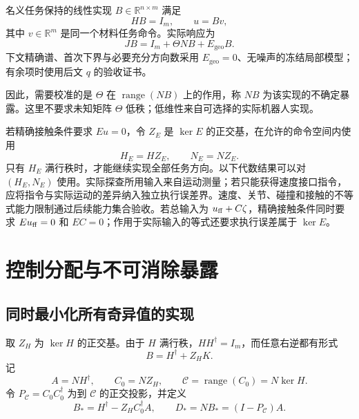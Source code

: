 \documentclass[11pt,a4paper]{article}
\numberwithin{equation}{section}
\theoremstyle{definition}
\begin{document}
名义任务保持的线性实现 $B\in\mathbb R^{n\times m}$ 满足
\begin{equation}
  HB=I_m,\qquad u=Bv ,
  \label{eq:cal-lift}
\end{equation}
其中 $v\in\mathbb R^m$ 是同一个材料任务命令。实际响应为
\begin{equation}
  JB=I_m+\Theta NB+E_{\mathrm{geo}}B .
  \label{eq:cal-exposure}
\end{equation}
下文精确谱、首次下界与必要充分方向数采用 $E_{\mathrm{geo}}=0$、无噪声的冻结局部模型；有余项时使用后文 $q$ 的验收证书。

因此，需要校准的是 $\Theta$ 在 $\operatorname{range}(NB)$ 上的作用，称 $NB$ 为该实现的不确定暴露。这里不要求未知矩阵 $\Theta$ 低秩；低维性来自可选择的实际机器人实现。

若精确接触条件要求 $Eu=0$，令 $Z_E$ 是 $\ker E$ 的正交基，在允许的命令空间内使用
\begin{equation}
  H_E=HZ_E,\qquad N_E=NZ_E .
  \label{eq:cal-contact-reduction}
\end{equation}
只有 $H_E$ 满行秩时，才能继续实现全部任务方向。以下代数结果可以对 $(H_E,N_E)$ 使用。实际探查所用输入来自运动测量；若只能获得速度接口指令，应将指令与实际运动的差异纳入独立执行误差界。速度、关节、碰撞和接触的不等式能力限制通过后续能力集合验收。若总输入为 $u_{\rm ff}+C\zeta$，精确接触条件同时要求 $Eu_{\rm ff}=0$ 和 $EC=0$；作用于实际输入的等式还要求执行误差属于 $\ker E$。





\section{控制分配与不可消除暴露}
\label{sec:cal-realization}

\subsection{同时最小化所有奇异值的实现}

取 $Z_H$ 为 $\ker H$ 的正交基。由于 $H$ 满行秩，$HH^\dagger=I_m$，而任意右逆都有形式
\begin{equation}
  B=H^\dagger+Z_HK .
  \label{eq:cal-all-lifts}
\end{equation}
记
\begin{equation}
  A=NH^\dagger,\qquad C_0=NZ_H,\qquad
  \mathcal C=\operatorname{range}(C_0)=N\ker H .
\end{equation}
令 $P_{\mathcal C}=C_0C_0^\dagger$ 为到 $\mathcal C$ 的正交投影，并定义
\begin{equation}
  B_*=
  H^\dagger-Z_HC_0^\dagger A,\qquad
  D_*=
  NB_*=(I-P_{\mathcal C})A .
  \label{eq:cal-optimal-lift}
\end{equation}
\end{document}
